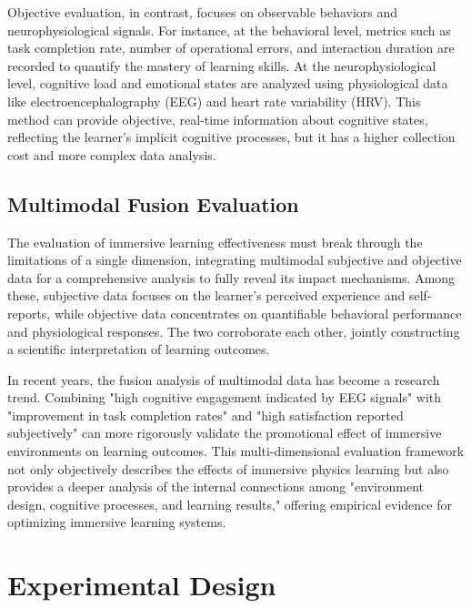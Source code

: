 \documentclass[runningheads]{llncs}
\begin{document}
Objective evaluation, in contrast, focuses on observable behaviors\cite{mayer2003nine} and neurophysiological signals. For instance, at the behavioral level, metrics such as task completion rate, number of operational errors, and interaction duration are recorded to quantify the mastery of learning skills. At the neurophysiological level, cognitive load and emotional states are analyzed using physiological data like electroencephalography (EEG) and heart rate variability (HRV)\cite{liu2023fusion,brugnera2016cortical,kobayashi2025pilot}. This method can provide objective, real-time information about cognitive states, reflecting the learner's implicit cognitive processes, but it has a higher collection cost and more complex data analysis\cite{diarra2025systematic}.


\subsection{Multimodal Fusion Evaluation}
The evaluation of immersive learning effectiveness must break through the limitations of a single dimension, integrating multimodal subjective and objective data for a comprehensive analysis to fully reveal its impact mechanisms\cite{tao2025learning,sharma2020multimodal}. Among these, subjective data focuses on the learner's perceived experience and self-reports, while objective data concentrates on quantifiable behavioral performance and physiological responses. The two corroborate each other, jointly constructing a scientific interpretation of learning outcomes\cite{dengel2018immersive}.

In recent years, the fusion analysis of multimodal data has become a research trend. Combining "high cognitive engagement indicated by EEG signals" with "improvement in task completion rates" and "high satisfaction reported subjectively" can more rigorously validate the promotional effect of immersive environments on learning outcomes\cite{DUBOVI2022104495}. This multi-dimensional evaluation framework not only objectively describes the effects of immersive physics learning but also provides a deeper analysis of the internal connections among "environment design, cognitive processes, and learning results," offering empirical evidence for optimizing immersive learning systems\cite{lindgren2016enhancing,liu2024behavioral}.

\section{Experimental Design}
\end{document}
